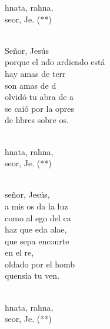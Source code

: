 \begin{cancion}[Marahnata][Nico]%
	\begin{chorus}%
	hnata, rahna,\\
	 seor, Je. (**)\\
	\end{chorus}%
	\jump\\
	 Señor, Jesús\\
	porque el ndo ardiendo está\\
	hay amas de terr\\
	son amas de d\\
	 olvidó tu abra de a\\
	se caió por la opres\\
	de hbres sobre os.\\\jump\\
	\begin{chorus}%
	hnata, rahna,\\
	 seor, Je. (**)\\
	\end{chorus}%
	\jump\\
	 señor, Jesús,\\
	a mis os da la luz\\
	como al ego del ca\\
	haz que eda alae,\\
	que sepa enconrte\\
	en el re,\\
	oldado por el homb\\
	quensía tu ven.\\\jump\\
	\begin{chorus}%
	hnata, rahna,\\
	 seor, Je. (**)\\
	\end{chorus}%
	\jump\\
\end{cancion}%
